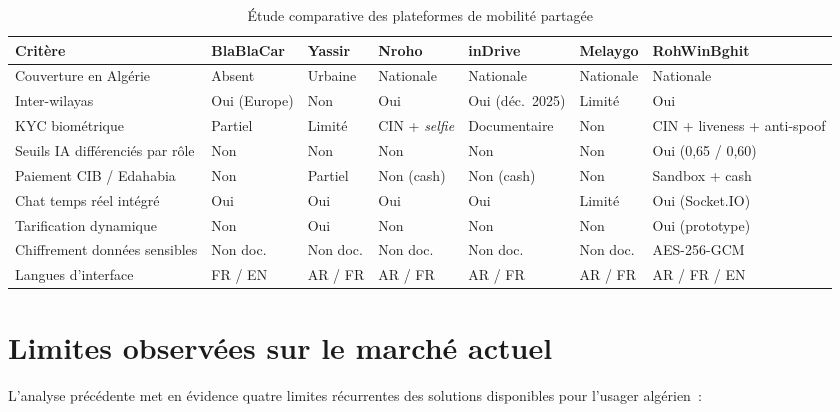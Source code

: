 \documentclass[12pt, a4paper, oneside]{report}
\begin{document}
\begin{table}[H]
\centering
\small
\begin{tabularx}{\textwidth}{|l|X|X|X|X|X|X|}
\hline
\rowcolor{rohlight}
\textbf{Critère} & \textbf{BlaBlaCar} & \textbf{Yassir} & \textbf{Nroho} & \textbf{inDrive} & \textbf{Melaygo} & \textbf{RohWinBghit} \\
\hline
Couverture en Algérie & Absent & Urbaine & Nationale & Nationale & Nationale & Nationale \\
\hline
Inter-wilayas & Oui (Europe) & Non & Oui & Oui (déc.~2025) & Limité & Oui \\
\hline
KYC biométrique & Partiel & Limité & CIN + \textit{selfie} & Documentaire & Non & CIN + liveness + anti-spoof \\
\hline
Seuils IA différenciés par rôle & Non & Non & Non & Non & Non & Oui (0,65 / 0,60) \\
\hline
Paiement CIB / Edahabia & Non & Partiel & Non (cash) & Non (cash) & Non & Sandbox + cash \\
\hline
Chat temps réel intégré & Oui & Oui & Oui & Oui & Limité & Oui (Socket.IO) \\
\hline
Tarification dynamique & Non & Oui & Non & Non & Non & Oui (prototype) \\
\hline
Chiffrement données sensibles & Non doc. & Non doc. & Non doc. & Non doc. & Non doc. & AES-256-GCM \\
\hline
Langues d'interface & FR / EN & AR / FR & AR / FR & AR / FR & AR / FR & AR / FR / EN \\
\hline
\end{tabularx}
  \caption{Étude comparative des plateformes de mobilité partagée}
  \label{tab:comparatif}
\end{table}

\section{Limites observées sur le marché actuel}
\label{sec:limites}

L'analyse précédente met en évidence quatre limites récurrentes des solutions disponibles pour l'usager algérien~:
\end{document}
